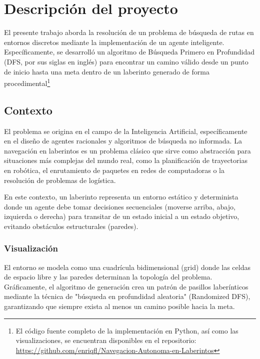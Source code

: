 %
%

\section{Descripción del proyecto}
El presente trabajo aborda la resolución de un problema de búsqueda de rutas en entornos discretos mediante la implementación de un agente inteligente. Específicamente,
se desarrolló un algoritmo de Búsqueda Primero en Profundidad (DFS, por sus siglas en inglés) para encontrar un camino válido desde un punto de inicio hasta
una meta dentro de un laberinto generado de forma procedimental\footnote{El código fuente completo
de la implementación en Python, así como las visualizaciones, se encuentran disponibles en el repositorio:
\url{https://github.com/enriqfl/Navegacion-Autonoma-en-Laberintos}}

\subsection{Contexto}

El problema se origina en el campo de la Inteligencia Artificial, específicamente en el diseño de agentes racionales y algoritmos de búsqueda no informada. La navegación en laberintos es un problema clásico que sirve como abstracción para situaciones más complejas del mundo real, como la planificación de trayectorias en robótica, el enrutamiento de paquetes en redes de computadoras o la resolución de problemas de logística.

En este contexto, un laberinto representa un entorno estático y determinista donde un agente debe tomar decisiones secuenciales (moverse arriba, abajo, izquierda o derecha) para transitar de un estado inicial a un estado objetivo, evitando obstáculos estructurales (paredes).

\subsubsection{Visualización}
El entorno se modela como una cuadrícula bidimensional (grid) donde las celdas de espacio libre y las paredes determinan la topología del problema. Gráficamente, el algoritmo de generación crea un patrón de pasillos laberínticos mediante la técnica de "búsqueda en profundidad aleatoria" (Randomized DFS), garantizando que siempre exista al menos un camino posible hacia la meta.

